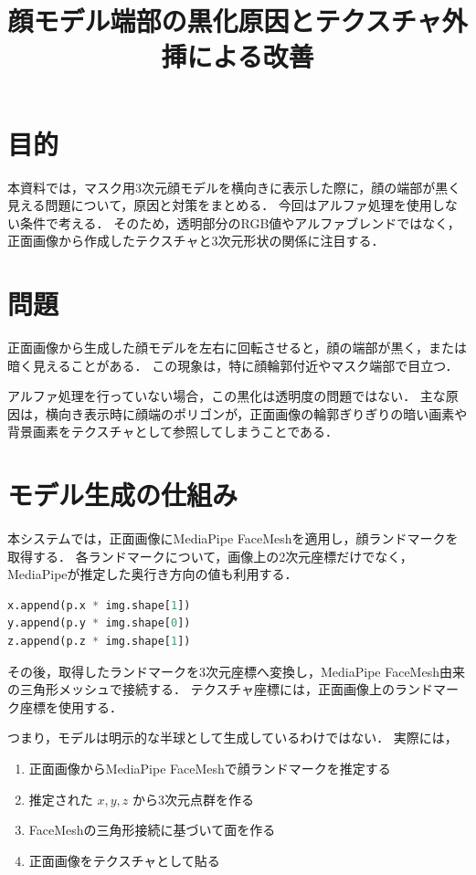 \documentclass[uplatex,dvipdfmx]{jsarticle}
\title{顔モデル端部の黒化原因とテクスチャ外挿による改善}
\author{}
\date{}
\begin{document}
\maketitle

\section{目的}

本資料では，マスク用3次元顔モデルを横向きに表示した際に，顔の端部が黒く見える問題について，原因と対策をまとめる．
今回はアルファ処理を使用しない条件で考える．
そのため，透明部分のRGB値やアルファブレンドではなく，正面画像から作成したテクスチャと3次元形状の関係に注目する．

\section{問題}

正面画像から生成した顔モデルを左右に回転させると，顔の端部が黒く，または暗く見えることがある．
この現象は，特に顔輪郭付近やマスク端部で目立つ．

アルファ処理を行っていない場合，この黒化は透明度の問題ではない．
主な原因は，横向き表示時に顔端のポリゴンが，正面画像の輪郭ぎりぎりの暗い画素や背景画素をテクスチャとして参照してしまうことである．

\section{モデル生成の仕組み}

本システムでは，正面画像にMediaPipe FaceMeshを適用し，顔ランドマークを取得する．
各ランドマークについて，画像上の2次元座標だけでなく，MediaPipeが推定した奥行き方向の値も利用する．

\begin{lstlisting}[language=Python]
x.append(p.x * img.shape[1])
y.append(p.y * img.shape[0])
z.append(p.z * img.shape[1])
\end{lstlisting}

その後，取得したランドマークを3次元座標へ変換し，MediaPipe FaceMesh由来の三角形メッシュで接続する．
テクスチャ座標には，正面画像上のランドマーク座標を使用する．

つまり，モデルは明示的な半球として生成しているわけではない．
実際には，

\begin{enumerate}
  \item 正面画像からMediaPipe FaceMeshで顔ランドマークを推定する
  \item 推定された $x, y, z$ から3次元点群を作る
  \item FaceMeshの三角形接続に基づいて面を作る
  \item 正面画像をテクスチャとして貼る
\end{enumerate}
\end{document}
